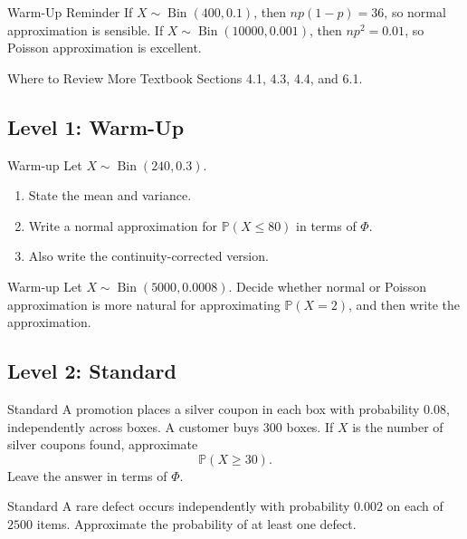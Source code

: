\documentclass[12pt]{article}
\newcommand{\PP}{\mathbb{P}}
\newcommand{\Bin}{\operatorname{Bin}}
\newcommand{\writespace}[1]{\vspace*{#1}}
\newcommand{\medws}{\writespace{1.8cm}}
\newcommand{\longws}{\writespace{2.8cm}}
\newcounter{problem}[section]
\begin{document}
\begin{examplebox}{Warm-Up Reminder}
If $X\sim\Bin(400,0.1)$, then $np(1-p)=36$, so normal approximation is sensible. If $X\sim\Bin(10000,0.001)$, then $np^2=0.01$, so Poisson approximation is excellent.
\end{examplebox}

\begin{reviewbox}{Where to Review More}
Textbook Sections 4.1, 4.3, 4.4, and 6.1.
\end{reviewbox}

\subsection*{Level 1: Warm-Up}

\begin{practiceproblem}{Warm-up}
Let $X\sim\Bin(240,0.3)$.
\begin{enumerate}
  \item State the mean and variance.
  \item Write a normal approximation for $\PP(X\le 80)$ in terms of $\Phi$.
  \item Also write the continuity-corrected version.
\end{enumerate}
\end{practiceproblem}
\medws

\begin{practiceproblem}{Warm-up}
Let $X\sim\Bin(5000,0.0008)$. Decide whether normal or Poisson approximation is more natural for approximating $\PP(X=2)$, and then write the approximation.
\end{practiceproblem}
\medws

\subsection*{Level 2: Standard}

\begin{practiceproblem}{Standard}
A promotion places a silver coupon in each box with probability $0.08$, independently across boxes. A customer buys $300$ boxes. If $X$ is the number of silver coupons found, approximate
\[
  \PP(X\ge 30).
\]
Leave the answer in terms of $\Phi$.
\end{practiceproblem}
\longws

\begin{practiceproblem}{Standard}
A rare defect occurs independently with probability $0.002$ on each of $2500$ items. Approximate the probability of at least one defect.
\end{practiceproblem}
\medws
\end{document}
